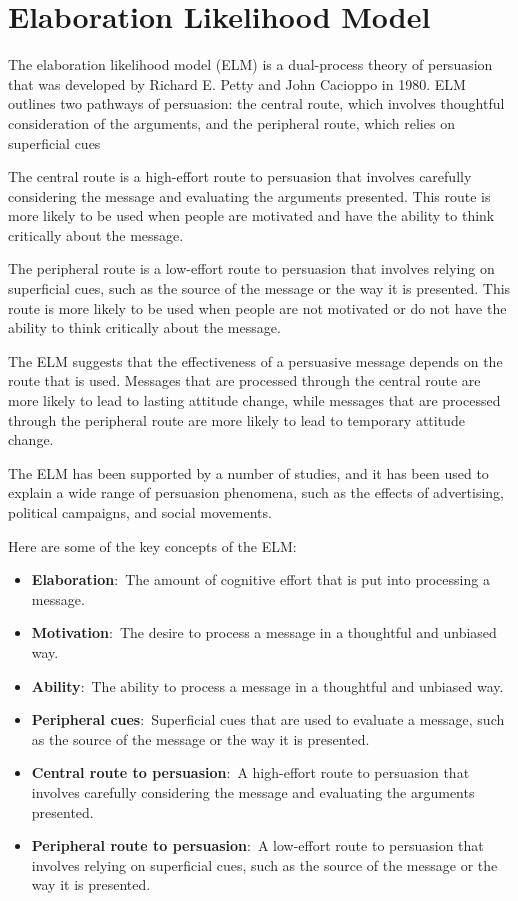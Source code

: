 \documentclass[
]{book}
\begin{document}
\section{Elaboration Likelihood Model}\label{elaboration-likelihood-model}

The elaboration likelihood model (ELM) is a dual-process theory of persuasion that was developed by Richard E. Petty and John Cacioppo in 1980. ELM outlines two pathways of persuasion: the central route, which involves thoughtful consideration of the arguments, and the peripheral route, which relies on superficial cues

The central route is a high-effort route to persuasion that involves carefully considering the message and evaluating the arguments presented. This route is more likely to be used when people are motivated and have the ability to think critically about the message.

The peripheral route is a low-effort route to persuasion that involves relying on superficial cues, such as the source of the message or the way it is presented. This route is more likely to be used when people are not motivated or do not have the ability to think critically about the message.

The ELM suggests that the effectiveness of a persuasive message depends on the route that is used. Messages that are processed through the central route are more likely to lead to lasting attitude change, while messages that are processed through the peripheral route are more likely to lead to temporary attitude change.

The ELM has been supported by a number of studies, and it has been used to explain a wide range of persuasion phenomena, such as the effects of advertising, political campaigns, and social movements.

Here are some of the key concepts of the ELM:

\begin{itemize}
\item
  \textbf{Elaboration}:~The amount of cognitive effort that is put into processing a message.
\item
  \textbf{Motivation}:~The desire to process a message in a thoughtful and unbiased way.
\item
  \textbf{Ability}:~The ability to process a message in a thoughtful and unbiased way.
\item
  \textbf{Peripheral cues}:~Superficial cues that are used to evaluate a message, such as the source of the message or the way it is presented.
\item
  \textbf{Central route to persuasion}:~A high-effort route to persuasion that involves carefully considering the message and evaluating the arguments presented.
\item
  \textbf{Peripheral route to persuasion}:~A low-effort route to persuasion that involves relying on superficial cues, such as the source of the message or the way it is presented.
\end{itemize}
\end{document}
